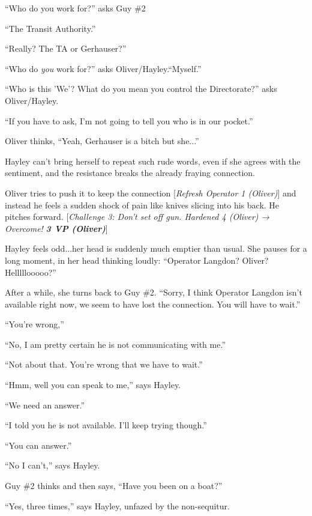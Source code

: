 ``Who do you work for?'' asks Guy \#2

``The Transit Authority.''

``Really?  The TA or Gerhauser?''

``Who do \textit{you }work for?'' asks Oliver/Hayley.``Myself.''



``Who is this 'We'?  What do you mean you control the Directorate?'' asks Oliver/Hayley.

``If you have to ask, I'm not going to tell you who is in our pocket.''



Oliver thinks, ``Yeah, Gerhauser is a bitch but she...''

Hayley can't bring herself to repeat such rude words, even if she agrees with the sentiment, and the resistance breaks the already fraying connection.



Oliver tries to push it to keep the connection {[}\textit{Refresh Operator 1 (Oliver)}{]} and instead he feels a sudden shock of pain like knives slicing into his back.  He pitches forward.  {[}\textit{Challenge 3: Don't set off gun.  Hardened 4 (Oliver) → Overcome! }\textit{\textbf{3 VP (Oliver)}}{]}



Hayley feels odd...her head is suddenly much emptier than usual.  She pauses for a long moment, in her head thinking loudly: ``Operator Langdon?  Oliver?  Helllllooooo?''



After a while, she turns back to Guy \#2.  ``Sorry, I think Operator Langdon isn't available right now, we seem to have lost the connection.  You will have to wait.''

``You're wrong,''

``No, I am pretty certain he is not communicating with me.''

``Not about that.  You're wrong that we have to wait.''

``Hmm, well you can speak to me,'' says Hayley.

``We need an answer.'' 

``I told you he is not available.  I'll keep trying though.''

``You can answer.''

``No I can't,'' says Hayley.

Guy \#2 thinks and then says, ``Have you been on a boat?''

``Yes, three times,'' says Hayley, unfazed by the non-sequitur.


